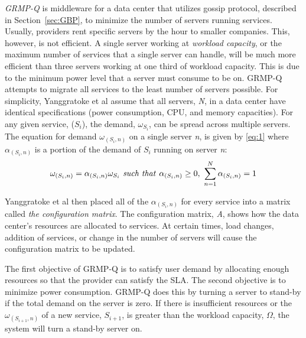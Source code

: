 \documentclass{sig-alternate}
\begin{document}
\emph{GRMP-Q} is middleware for a data center that utilizes gossip protocol, described in Section~\ref{sec:GBP}, to minimize the number of servers running services. Usually, providers rent specific servers by the hour to smaller companies. This, however, is not efficient. A single server working at  \emph{workload capacity}, or the maximum number of services that a single server can handle, will be much more efficient than three servers working at one third of workload capacity. This is due to the minimum power level that a server must consume to be on. GRMP-Q attempts to migrate all services to the least number of servers possible.  For simplicity, Yanggratoke et al assume that all servers, \emph{N}, in a data center have identical specifications (power consumption, CPU, and memory capacities). For any given service, ($S_i$), the demand, \emph{$\omega_{S_i}$}, can be spread across multiple servers. The equation for demand $\omega_{(S_i,n)}$ on a single server \emph{n}, is given by \eqref{eq:1} where $\alpha_{(S_{i},n)}$ is a portion of the demand of $S_{i}$ running on server \emph{n}:
\begin{equation}
\omega_{(S_{i},n)} = \alpha_{(S_{i},n)} \omega_{S_i} \text{\emph{~such that~}} \alpha_{(S_{i},n)} \geq 0,~ \sum_{n=1}^{N} \alpha_{(S_{i},n)} = 1 \label{eq:1}
\end{equation}

Yanggratoke et al then placed all of the \emph{$\alpha_{(S_{i},n)}$} for every service into a matrix called \emph{the configuration matrix}. The configuration matrix, \emph{A}, shows how the data center's resources are allocated to services. At certain times, load changes, addition of services, or change in the number of servers will cause the configuration matrix to be updated. 

The first objective of GRMP-Q is to satisfy user demand by allocating enough resources so that the provider can satisfy the SLA. The second objective is to minimize power consumption. GRMP-Q does this by turning a server to stand-by if the total demand on the server is zero. If there is insufficient resources or the \emph{$\omega_{(S_{i+1},n)}$} of a new service, $S_{i+1}$, is greater than the workload capacity, $\Omega$, the system will turn a stand-by server on. 
\end{document}
